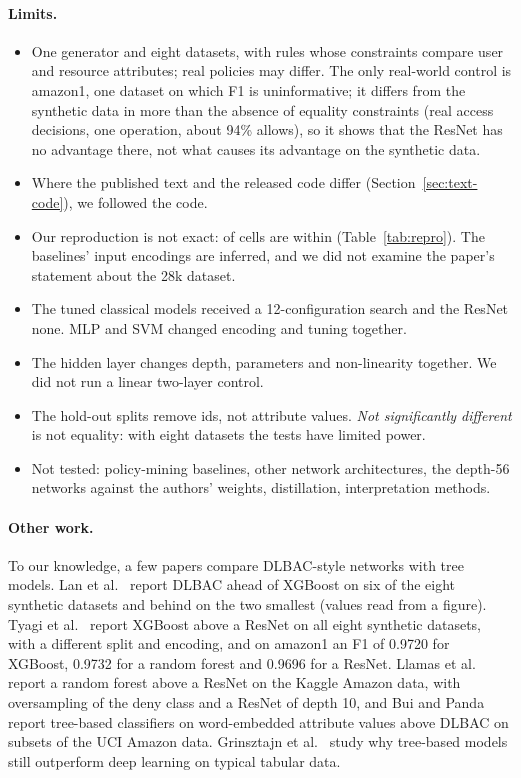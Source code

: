 \documentclass[11pt,a4paper]{article}
\begin{document}
\paragraph{Limits.}
\begin{itemize}[itemsep=2pt]
\item One generator and eight datasets, with rules whose constraints compare user and resource attributes; real policies may differ. The only real-world control is amazon1, one dataset on which F1 is uninformative; it differs from the synthetic data in more than the absence of equality constraints (real access decisions, one operation, about 94\% allows), so it shows that the ResNet has no advantage there, not what causes its advantage on the synthetic data.
\item Where the published text and the released code differ (Section~\ref{sec:text-code}), we followed the code.
\item Our reproduction is not exact: \reproWithin{} of \reproCells{} cells are within \reproTol{} (Table~\ref{tab:repro}). The baselines' input encodings are inferred, and we did not examine the paper's statement about the 28k dataset.
\item The tuned classical models received a 12-configuration search and the ResNet none. MLP and SVM changed encoding and tuning together.
\item The hidden layer changes depth, parameters and non-linearity together. We did not run a linear two-layer control.
\item The hold-out splits remove ids, not attribute values. \emph{Not significantly different} is not equality: with eight datasets the tests have limited power.
\item Not tested: policy-mining baselines, other network architectures, the depth-56 networks against the authors' weights, distillation, interpretation methods.
\end{itemize}

\paragraph{Other work.} To our knowledge, a few papers compare DLBAC-style networks with tree models. Lan et al.\ \cite{lan2024} report DLBAC ahead of XGBoost on six of the eight synthetic datasets and behind on the two smallest (values read from a figure). Tyagi et al.\ \cite{tyagi2024} report XGBoost above a ResNet on all eight synthetic datasets, with a different split and encoding, and on amazon1 an F1 of 0.9720 for XGBoost, 0.9732 for a random forest and 0.9696 for a ResNet. Llamas et al.\ \cite{llamas2025} report a random forest above a ResNet on the Kaggle Amazon data, with oversampling of the deny class and a ResNet of depth 10, and Bui and Panda \cite{bui2025} report tree-based classifiers on word-embedded attribute values above DLBAC on subsets of the UCI Amazon data. Grinsztajn et al.\ \cite{grinsztajn2022} study why tree-based models still outperform deep learning on typical tabular data.
\end{document}
